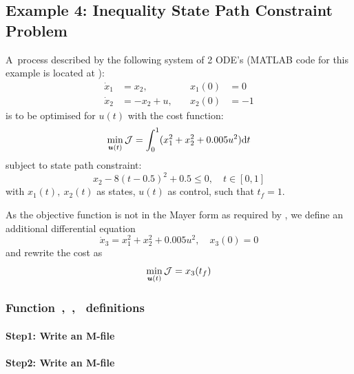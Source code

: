 \subsection{Example 4: Inequality State Path Constraint Problem}
\label{sec:statepathconprob}

A~process described by the following system of 2
ODE's \citep{jac69,fee98} (MATLAB code for this example is located
at ):
\begin{align}
\dot{x}_1 &= x_{2}, &\quad x_{1}(0) &= 0\\
\dot{x}_2 &= -x_{2} + u, &\quad x_{2}(0) &= -1
\end{align}is to be optimised for $u(t)$ with the cost function:
\begin{equation}
\min_{\ve{u}(t)} \mf{J} = \int_{0}^{1}(x_{1}^{2} + x_{2}^{2} +
0.005u^{2})\dt \label{eq:ispcpa} 
\end{equation} subject to state path constraint:
\begin{equation}
x_{2} - 8(t - 0.5)^{2} + 0.5 \leq 0, \quad t \in [0,1]  
\end{equation} with $x_{1}(t),~x_{2}(t)$ as states, $u(t)$ as control,
such that $t_{f}=1$. 

As the objective function is not in the Mayer form as required by
, we define an additional differential equation
\begin{equation}
\dot{x}_3 =  x_1^2+x_2^2+0.005u^2, \quad x_3(0) = 0
\end{equation}
and rewrite the cost as
\begin{equation} 
\min_{\ve{u}(t)} \mf{J} = x_3(t_f) \label{eq:ispcpb} 
\end{equation}

\subsubsection{Function~,~,~  definitions}
\label{sec:statepathconprob-fundef}

\paragraph{Step1: Write an M-file }

{\small }

\paragraph{Step2: Write an M-file~}

